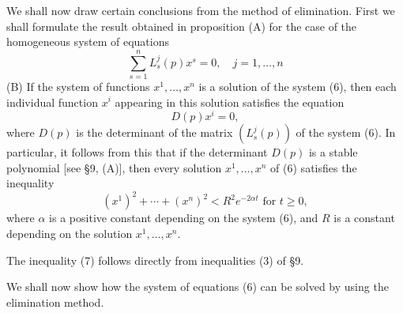 \documentclass[10pt,a5paper]{book}
\theoremstyle{plain}
\theoremstyle{definition}
\theoremstyle{remark}
\begin{document}
We shall now draw certain conclusions from the method of elimination. First we shall formulate the result obtained in proposition (A) for the case of the homogeneous system of equations
\begin{equation*}
\sum_{s=1}^{n} L_{s}^{j}(p) x^{s}=0, \quad j=1, \ldots, n \tag{6}
\end{equation*}
(B) If the system of functions $x^{1}, \ldots, x^{n}$ is a solution of the system (6), then each individual function $x^{i}$ appearing in this solution satisfies the equation
\[
D(p) x^{i}=0,
\]
where $D(p)$ is the determinant of the matrix $\left(L_{s}^{j}(p)\right)$ of the system (6). In particular, it follows from this that if the determinant $D(p)$ is a stable polynomial [see §9, (A)], then every solution $x^{1}, \ldots, x^{n}$ of (6) satisfies the inequality
\begin{equation*}
\left(x^{1}\right)^{2}+\cdots+\left(x^{n}\right)^{2}<R^{2} e^{-2 \alpha t} \text { for } t \geq 0, \tag{7}
\end{equation*}
where $\alpha$ is a positive constant depending on the system (6), and $R$ is a constant depending on the solution $x^{1}, \ldots, x^{n}$.

The inequality (7) follows directly from inequalities (3) of §9.

We shall now show how the system of equations (6) can be solved by using the elimination method.
\end{document}
